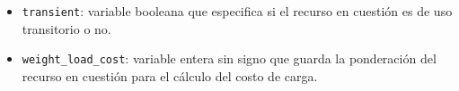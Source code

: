 \documentclass[../informe2.tex]{subfiles}
\begin{document}
\noindent\begin{minipage}{0.5\textwidth}
	\small
	\begin{itemize}
		\item \texttt{transient}: variable booleana que especifica si el recurso en cuestión es de uso transitorio o no.
		\item \texttt{weight\_load\_cost}: variable entera sin signo que guarda la ponderación del recurso en cuestión para el cálculo del costo de carga.
	\end{itemize}
\end{minipage}
\hfill
\begin{minipage}{0.4\textwidth}
\end{minipage}

\bigskip
\end{document}
